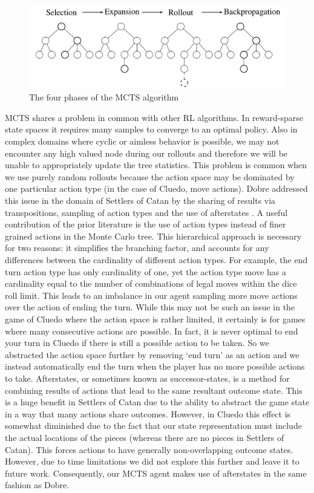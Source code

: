 \documentclass[msc, deptreport, ai, romanprepages]{infthesis}
\begin{document}
\begin{figure}[h]
\caption{The four phases of the MCTS algorithm}
\centering
\includegraphics[scale=.825]{figures/MCTS}
\end{figure}


MCTS shares a problem in common with other RL algorithms. In reward-sparse state spaces it requires many samples to converge to an optimal policy. Also in complex domains where cyclic or aimless behavior is possible, we may not encounter any high valued node during our rollouts and therefore we will be unable to appropriately update the tree statistics. This problem is common when we use purely random rollouts because the action space may be dominated by one particular action type (in the case of Cluedo, move actions). Dobre addressed this issue in the domain of Settlers of Catan by the sharing of results via transpositions, sampling of action types and the use of afterstates \cite{Mihai}. A useful contribution of the prior literature is the use of action types instead of finer grained actions in the Monte Carlo tree. This hierarchical approach is necessary for two reasons: it simplifies the branching factor, and accounts for any differences between the cardinality of different action types. For example, the end turn action type has only cardinality of one, yet the action type move has a cardinality equal to the number of combinations of legal moves within the dice roll limit. This leads to an imbalance in our agent sampling more move actions over the action of ending the turn. While this may not be such an issue in the game of Cluedo where the action space is rather limited, it certainly is for games where many consecutive actions are possible. In fact, it is never optimal to end your turn in Cluedo if there is still a possible action to be taken. So we abstracted the action space further by removing ‘end turn’ as an action and we instead automatically end the turn when the player has no more possible actions to take. Afterstates, or sometimes known as successor-states, is a method for combining results of actions that lead to the same resultant outcome state. This is a huge benefit in Settlers of Catan due to the ability to abstract the game state in a way that many actions share outcomes. However, in Cluedo this effect is somewhat diminished due to the fact that our state representation must include the actual locations of the pieces (whereas there are no pieces in Settlers of Catan). This forces actions to have generally non-overlapping outcome states. However, due to time limitations we did not explore this further and leave it to future work. Consequently, our MCTS agent makes use of afterstates in the same fashion as Dobre.
\end{document}
